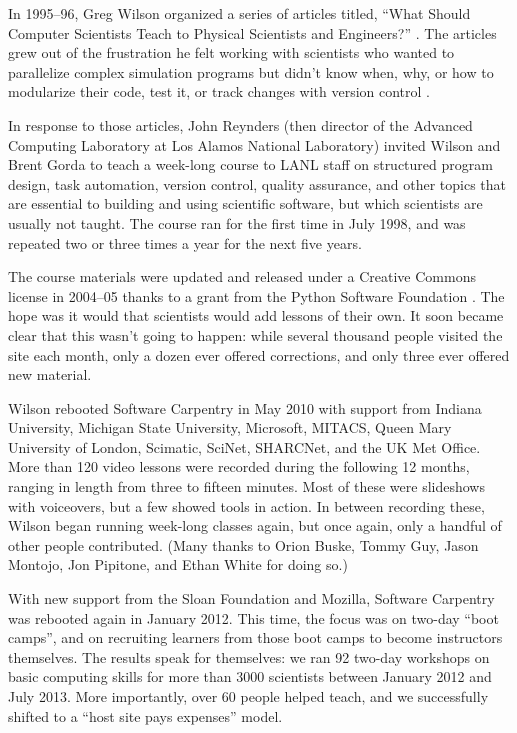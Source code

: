 \documentclass{article}
\begin{document}
In 1995--96,
Greg Wilson organized a series of articles titled,
``What Should Computer Scientists Teach to Physical Scientists and Engineers?''
\cite{wilson1996}.
The articles grew out of the frustration he felt working with scientists
who wanted to parallelize complex simulation programs
but didn't know when, why, or how to modularize their code,
test it,
or track changes with version control
\cite{wilson2006a}.

In response to those articles,
John Reynders
(then director of the Advanced Computing Laboratory at Los Alamos National Laboratory)
invited Wilson and Brent Gorda to teach
a week-long course to LANL staff
on structured program design,
task automation,
version control,
quality assurance,
and other topics that are essential to building and using scientific software,
but which scientists are usually not taught.
The course ran for the first time in July 1998,
and was repeated two or three times a year
for the next five years.

The course materials were updated and released under a Creative Commons license in 2004--05
thanks to a grant from the Python Software Foundation \cite{wilson2006b}.
The hope was it would that scientists would add lessons of their own.
It soon became clear that this wasn't going to happen:
while several thousand people visited the site each month,
only a dozen ever offered corrections,
and only three ever offered new material.

Wilson rebooted Software Carpentry in May 2010
with support from Indiana University,
Michigan State University,
Microsoft,
MITACS,
Queen Mary University of London,
Scimatic,
SciNet,
SHARCNet,
and the UK Met Office.
More than 120 video lessons were recorded during the following 12 months,
ranging in length from three to fifteen minutes.
Most of these were slideshows with voiceovers,
but a few showed tools in action.
In between recording these,
Wilson began running week-long classes again,
but once again,
only a handful of other people contributed.
(Many thanks to Orion Buske, Tommy Guy, Jason Montojo, Jon Pipitone, and Ethan White for doing so.)

With new support from the Sloan Foundation and Mozilla,
Software Carpentry was rebooted again in January 2012.
This time,
the focus was on two-day ``boot camps'',
and on recruiting learners from those boot camps to become instructors themselves.
The results speak for themselves:
we ran 92 two-day workshops on basic computing skills
for more than 3000 scientists
between January 2012 and July 2013.
More importantly,
over 60 people helped teach,
and we successfully shifted to a ``host site pays expenses'' model.
\end{document}
